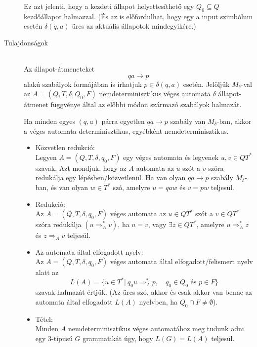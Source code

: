 \documentclass[margin=0px]{article}
\begin{document}
\begin{description}
        Ez azt jelenti, hogy a kezdeti állapot helyettesíthető egy $Q_0 \subseteq Q$ kezdőállapot halmazzal.
        (És az is előfordulhat, hogy egy a input szimbólum esetén $\delta(q, a)$ üres az aktuális állapotok mindegyikére.)
    \item[Tulajdonságok] \hfill \\
        Az állapot-átmeneteket
        \[qa \rightarrow p\]
        alakú szabályok formájában is írhatjuk $p \in \delta(q, a) $ esetén. Jelöljük $M_\delta$-val az $A = (Q, T, \delta,Q_0, F)$ nemdeterminisztikus véges automata $\delta$ állapot-átmenet függvénye által az előbbi módon származó szabályok halmazát.

        Ha minden egyes $(q, a)$ párra egyetlen $qa \rightarrow p$ szabály van $M_\delta$-ban, akkor a véges automata determinisztikus, egyébként nemdeterminisztikus.

        \begin{itemize}
            \item Közvetlen redukció: \\
                  Legyen $A = (Q, T, \delta, q_0, F)$ egy véges automata és legyenek $u, v \in QT^*$ szavak. Azt mondjuk, hogy az $A$ automata az $u$ szót a $v$ szóra redukálja egy lépésben/közvetlenül. Ha van olyan $qa \rightarrow p$ szabály $M_\delta$-ban, és van olyan $w \in T^*$ szó, amelyre $u = qaw$ és $v = pw$ teljesül.

            \item Redukció:\\
                  Az $A = (Q, T, \delta, q_0, F)$ véges automata az $u \in QT^*$ szót a $v \in QT^*$ szóra redukálja $(u \Longrightarrow_A^* v)$, ha $u = v$, vagy $ \exists z \in QT^*$, amelyre $u \Longrightarrow_A^* z$ és $z \Longrightarrow_A v$ teljesül.

            \item Az automata által elfogadott nyelv:\\
                  Az $A = (Q, T, \delta, q_0, F)$ véges automata által elfogadott/felismert nyelv alatt az \[ L(A) = \{u \in T^* | \ q_0u \Longrightarrow_A^* p, \quad q_0 \in Q_0  \textrm{ és }  p \in F\} \] szavak halmazát értjük.  (Az üres szó, akkor és csak akkor van benne az automata által elfogadott $L(A)$ nyelvben, ha $Q_0 \cap F \neq \emptyset$).

            \item Tétel:\\
                  Minden $A$ nemdeterminisztikus véges automatához meg tudunk adni egy 3-típusú $G$ grammatikát úgy, hogy $L(G) = L(A)$ teljesül.


\end{itemize}
\end{description}
\end{document}
